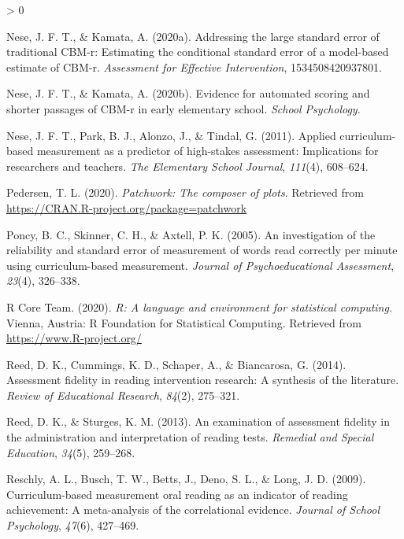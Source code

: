 \documentclass[
  english,
  man, fleqn, noextraspace]{apa6}
\newlength{\cslhangindent}
\newenvironment{CSLReferences}[2] %
 {%
  \setlength{\parindent}{0pt}
  \ifodd #1 \everypar{\setlength{\hangindent}{\cslhangindent}}\ignorespaces\fi
  \ifnum #2 > 0
  \setlength{\parskip}{#2\baselineskip}
  \fi
 }%
 {}
\begin{document}
\begin{CSLReferences}{1}{0}
\leavevmode\hypertarget{ref-nese2020sem}{}%
Nese, J. F. T., \& Kamata, A. (2020a). Addressing the large standard error of traditional CBM-r: Estimating the conditional standard error of a model-based estimate of CBM-r. \emph{Assessment for Effective Intervention}, 1534508420937801.

\leavevmode\hypertarget{ref-nese2020asr}{}%
Nese, J. F. T., \& Kamata, A. (2020b). Evidence for automated scoring and shorter passages of CBM-r in early elementary school. \emph{School Psychology}.

\leavevmode\hypertarget{ref-nese2011}{}%
Nese, J. F. T., Park, B. J., Alonzo, J., \& Tindal, G. (2011). Applied curriculum-based measurement as a predictor of high-stakes assessment: Implications for researchers and teachers. \emph{The Elementary School Journal}, \emph{111}(4), 608--624.

\leavevmode\hypertarget{ref-R-patchwork}{}%
Pedersen, T. L. (2020). \emph{Patchwork: The composer of plots}. Retrieved from \url{https://CRAN.R-project.org/package=patchwork}

\leavevmode\hypertarget{ref-poncy2005}{}%
Poncy, B. C., Skinner, C. H., \& Axtell, P. K. (2005). An investigation of the reliability and standard error of measurement of words read correctly per minute using curriculum-based measurement. \emph{Journal of Psychoeducational Assessment}, \emph{23}(4), 326--338.

\leavevmode\hypertarget{ref-R-base}{}%
R Core Team. (2020). \emph{R: A language and environment for statistical computing}. Vienna, Austria: R Foundation for Statistical Computing. Retrieved from \url{https://www.R-project.org/}

\leavevmode\hypertarget{ref-reed2014}{}%
Reed, D. K., Cummings, K. D., Schaper, A., \& Biancarosa, G. (2014). Assessment fidelity in reading intervention research: A synthesis of the literature. \emph{Review of Educational Research}, \emph{84}(2), 275--321.

\leavevmode\hypertarget{ref-reed2013}{}%
Reed, D. K., \& Sturges, K. M. (2013). An examination of assessment fidelity in the administration and interpretation of reading tests. \emph{Remedial and Special Education}, \emph{34}(5), 259--268.

\leavevmode\hypertarget{ref-reschly2009}{}%
Reschly, A. L., Busch, T. W., Betts, J., Deno, S. L., \& Long, J. D. (2009). Curriculum-based measurement oral reading as an indicator of reading achievement: A meta-analysis of the correlational evidence. \emph{Journal of School Psychology}, \emph{47}(6), 427--469.


\end{CSLReferences}
\end{document}
